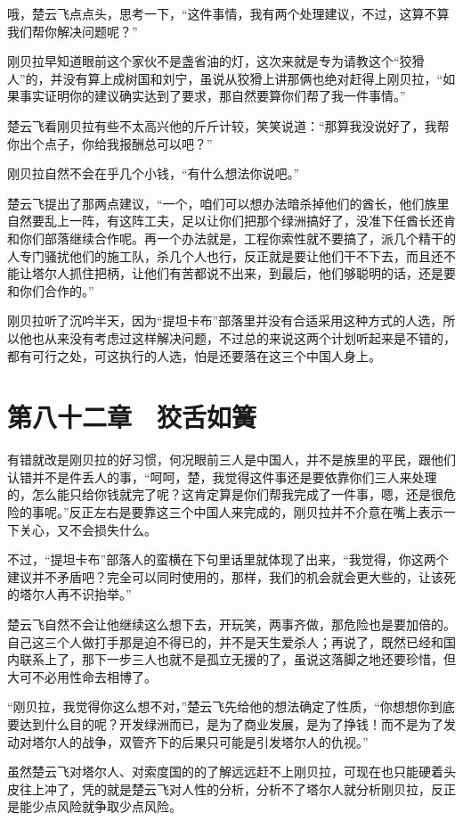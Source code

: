哦，楚云飞点点头，思考一下，“这件事情，我有两个处理建议，不过，这算不算我们帮你解决问题呢？”

刚贝拉早知道眼前这个家伙不是盏省油的灯，这次来就是专为请教这个“狡猾人”的，并没有算上成树国和刘宁，虽说从狡猾上讲那俩也绝对赶得上刚贝拉，“如果事实证明你的建议确实达到了要求，那自然要算你们帮了我一件事情。”

楚云飞看刚贝拉有些不太高兴他的斤斤计较，笑笑说道：“那算我没说好了，我帮你出个点子，你给我报酬总可以吧？”

刚贝拉自然不会在乎几个小钱，“有什么想法你说吧。”

楚云飞提出了那两点建议，“一个，咱们可以想办法暗杀掉他们的酋长，他们族里自然要乱上一阵，有这阵工夫，足以让你们把那个绿洲搞好了，没准下任酋长还肯和你们部落继续合作呢。再一个办法就是，工程你索性就不要搞了，派几个精干的人专门骚扰他们的施工队，杀几个人也行，反正就是要让他们干不下去，而且还不能让塔尔人抓住把柄，让他们有苦都说不出来，到最后，他们够聪明的话，还是要和你们合作的。”

刚贝拉听了沉吟半天，因为“提坦卡布”部落里并没有合适采用这种方式的人选，所以他也从来没有考虑过这样解决问题，不过总的来说这两个计划听起来是不错的，都有可行之处，可这执行的人选，怕是还要落在这三个中国人身上。

\section{第八十二章　狡舌如簧}

有错就改是刚贝拉的好习惯，何况眼前三人是中国人，并不是族里的平民，跟他们认错并不是件丢人的事，“呵呵，楚，我觉得这件事还是要依靠你们三人来处理的，怎么能只给你钱就完了呢？这肯定算是你们帮我完成了一件事，嗯，还是很危险的事呢。”反正左右是要靠这三个中国人来完成的，刚贝拉并不介意在嘴上表示一下关心，又不会损失什么。

不过，“提坦卡布”部落人的蛮横在下句里话里就体现了出来，“我觉得，你这两个建议并不矛盾吧？完全可以同时使用的，那样，我们的机会就会更大些的，让该死的塔尔人再不识抬举。”

楚云飞自然不会让他继续这么想下去，开玩笑，两事齐做，那危险也是要加倍的。自己这三个人做打手那是迫不得已的，并不是天生爱杀人；再说了，既然已经和国内联系上了，那下一步三人也就不是孤立无援的了，虽说这落脚之地还要珍惜，但大可不必用性命去相博了。

“刚贝拉，我觉得你这么想不对，”楚云飞先给他的想法确定了性质，“你想想你到底要达到什么目的呢？开发绿洲而已，是为了商业发展，是为了挣钱！而不是为了发动对塔尔人的战争，双管齐下的后果只可能是引发塔尔人的仇视。”

虽然楚云飞对塔尔人、对索度国的的了解远远赶不上刚贝拉，可现在也只能硬着头皮往上冲了，凭的就是楚云飞对人性的分析，分析不了塔尔人就分析刚贝拉，反正是能少点风险就争取少点风险。

